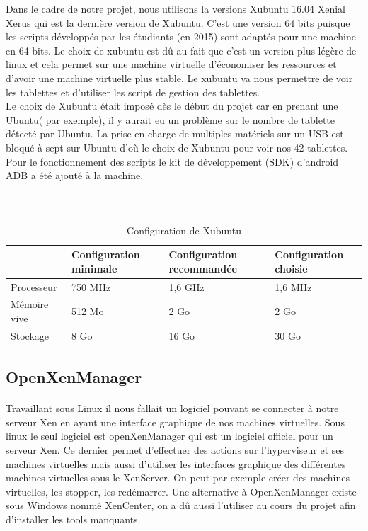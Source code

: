\documentclass[a4paper,12pt]{extarticle}
\begin{document}
Dans le cadre de notre projet, nous utilisons la versions Xubuntu 16.04 Xenial Xerus qui est la dernière version de Xubuntu. C’est une version 64 bits puisque les scripts développés par les étudiants (en 2015) sont adaptés pour une machine en 64 bits.
Le choix de xubuntu est dû au fait que c’est un version plus légère de linux et cela permet sur une machine virtuelle d’économiser les ressources et d’avoir une machine virtuelle plus stable.
Le xubuntu va nous permettre de voir les tablettes et d’utiliser les script de gestion des tablettes. \\
Le choix de Xubuntu était imposé dès le début du projet car en prenant une Ubuntu( par exemple), il y aurait eu  un problème sur le nombre de tablette détecté par Ubuntu. La prise en charge de multiples matériels sur un USB est bloqué à sept sur Ubuntu d'où le choix de Xubuntu pour voir nos 42 tablettes. 
Pour le fonctionnement des scripts le kit de développement (SDK) d’android ADB a été ajouté à la machine.

\paragraph{\\}
\begin{table}[!h]
\begin{tabular}{|p{3cm}|p{3cm}|p{3cm}|p{3cm}|}

\hline
 & Configuration  minimale & Configuration recommandée & Configuration choisie\\
\hline 
Processeur & 750 MHz & 1,6 GHz & 1,6 MHz\\
\hline
Mémoire vive & 512 Mo & 2 Go & 2 Go \\
\hline
Stockage & 8 Go & 16 Go & 30 Go \\
\hline
\end{tabular}
\caption{Configuration de Xubuntu}
\end{table}

\subsection{OpenXenManager}

\paragraph{}
Travaillant sous Linux il nous fallait un logiciel pouvant se connecter à notre serveur Xen en ayant une interface graphique de nos machines virtuelles. Sous linux le seul logiciel est openXenManager qui est un logiciel officiel pour un serveur Xen. Ce dernier permet d’effectuer des actions sur l’hyperviseur et ses machines virtuelles mais aussi d’utiliser les interfaces graphique des différentes machines virtuelles sous le XenServer. 
On peut par exemple créer des machines virtuelles, les stopper, les redémarrer. Une alternative à OpenXenManager existe sous Windows nommé XenCenter, on a dû aussi l’utiliser au cours du projet afin d’installer les tools manquants.
\end{document}
